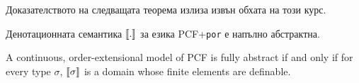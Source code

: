 Доказателството на следващата теорема излиза извън обхата на този курс.
\begin{framed}
  \begin{theorem}[Плоткин 1977]
    Денотационната семантика $\llbracket{.}\rrbracket$ за езика PCF+\texttt{por} е напълно абстрактна.
  \end{theorem}
\end{framed}

\begin{theorem}
  A continuous, order-extensional model of PCF is fully abstract if and only if for every type $\sigma$, $\llbracket{\sigma}\rrbracket$ is a domain whose finite elements are definable.
\end{theorem}

